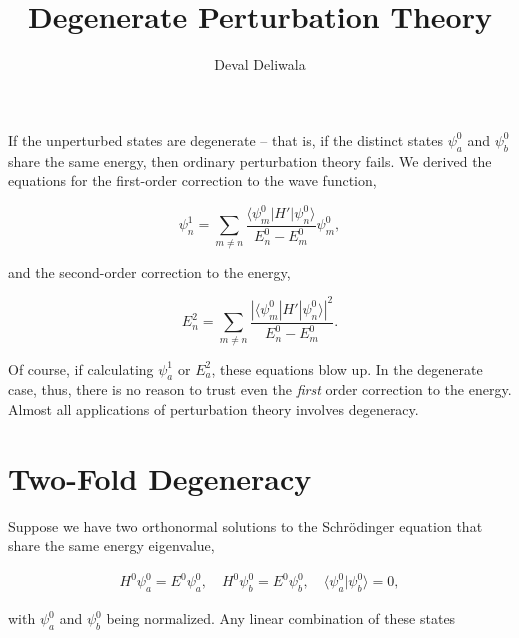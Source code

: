 \documentclass[svgnames]{article}     %
\title{Degenerate Perturbation Theory}
\author{Deval Deliwala}
\begin{document}
\maketitle

If the unperturbed states are degenerate -- that is, if the distinct states
$\psi_a^{0}$ and $\psi_b^{0}$ share the same energy, then ordinary perturbation
theory fails. We derived the equations for the first-order correction to the
wave function,

\[
  \psi_n^{1} = \sum_{m\neq n}^{} \frac{\langle \psi_m^{0} | H' | \psi_n^{0}
\rangle}{E_n^{0} - E_m^{0}} \psi_m^{0} ,
\] \vspace{3px}

and the second-order correction to the energy, 

\[
E_n^2 = \sum_{m\neq n}^{} \frac{| \langle \psi_m^{0} | H' | \psi_n^{0}
\rangle|^2}{E_n^{0} - E_m^{0}}.
\] \vspace{3px}

Of course, if calculating $\psi_a^{1}$ or $E_a^{2}$, these equations blow up.
In the degenerate case, thus, there is no reason to trust even the
\textit{first} order correction to the energy. Almost all applications of
perturbation theory involves degeneracy. 

\section{Two-Fold Degeneracy}

Suppose we have two orthonormal solutions to the Schr\"odinger equation that
share the same energy eigenvalue, 

\begin{align}\label{ortho}
H^{0} \psi_a^{0} = E^{0} \psi_a^{0}, \quad H^{0} \psi_b^{0} = E^{0} \psi_b^{0},
\quad \langle \psi_a^{0} | \psi_b^{0} \rangle = 0,
\end{align} \vspace{3px}

with $\psi_a^{0}$ and $\psi_b^{0}$ being normalized. Any linear combination of
these states
\end{document}
